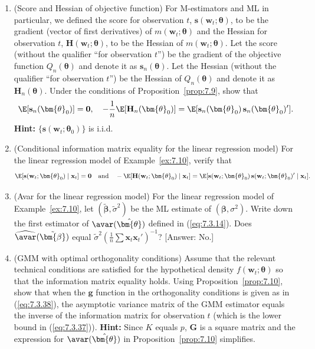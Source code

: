 \begin{enumerate}
\item (Score and Hessian of objective function) \enspace For M-estimators and ML in particular, we defined the score for observation $t$, $\mathbf{s}(\mathbf{w}_t; \bm{\theta})$, to be the gradient (vector of first derivatives) of $m(\mathbf{w}_t; \bm{\theta})$ and the Hessian for observation $t$, $\mathbf{H}(\mathbf{w}_t; \bm{\theta})$, to be the Hessian of $m(\mathbf{w}_t; \bm{\theta})$. Let the score (without the qualifier ``for observation $t$'') be the gradient of the objective function $Q_n(\bm{\theta})$ and denote it as $\mathbf{s}_n(\bm{\theta})$. Let the Hessian (without the qualifier ``for observation $t$'') be the Hessian of $Q_n(\bm{\theta})$ and denote it as $\mathbf{H}_n(\bm{\theta})$. Under the conditions of Proposition~\ref{prop:7.9}, show that
\[
\E[\mathbf{s}_n(\bm{\theta}_0)] = \mathbf{0}, \quad -\frac{1}{n}\E[\mathbf{H}_n(\bm{\theta}_0)] = \E[\mathbf{s}_n(\bm{\theta}_0)\,\mathbf{s}_n(\bm{\theta}_0)'].
\]
\textbf{Hint:} $\{\mathbf{s}(\mathbf{w}_t; \bm{\theta}_0)\}$ is i.i.d.

\item (Conditional information matrix equality for the linear regression model) \enspace For the linear regression model of Example~\ref{ex:7.10}, verify that
\[
\E[\mathbf{s}(\mathbf{w}_t; \bm{\theta}_0) \mid \mathbf{x}_t] = \mathbf{0} \quad \text{and} \quad -\E[\mathbf{H}(\mathbf{w}_t; \bm{\theta}_0) \mid \mathbf{x}_t] = \E[\mathbf{s}(\mathbf{w}_t; \bm{\theta}_0)\,\mathbf{s}(\mathbf{w}_t; \bm{\theta}_0)' \mid \mathbf{x}_t].
\]

\item (Avar for the linear regression model) \enspace For the linear regression model of Example~\ref{ex:7.10}, let $(\tilde{\bm{\beta}}, \tilde{\sigma}^2)$ be the ML estimate of $(\bm{\beta}, \sigma^2)$. Write down the first estimator of $\avar(\hat{\bm{\theta}})$ defined in (\ref{eq:7.3.14}). Does $\widehat{\avar}(\tilde{\bm{\beta}})$ equal $\tilde{\sigma}^2(\frac{1}{n}\sum \mathbf{x}_t \mathbf{x}_t')^{-1}$? [Answer: No.]

\item (GMM with optimal orthogonality conditions) \enspace Assume that the relevant technical conditions are satisfied for the hypothetical density $f(\mathbf{w}_t; \bm{\theta})$ so that the information matrix equality holds. Using Proposition~\ref{prop:7.10}, show that when the $\mathbf{g}$ function in the orthogonality conditions is given as in (\ref{eq:7.3.38}), the asymptotic variance matrix of the GMM estimator equals the inverse of the information matrix for observation $t$ (which is the lower bound in (\ref{eq:7.3.37})). \textbf{Hint:} Since $K$ equals $p$, $\mathbf{G}$ is a square matrix and the expression for $\avar(\hat{\bm{\theta}})$ in Proposition~\ref{prop:7.10} simplifies.
\end{enumerate}
